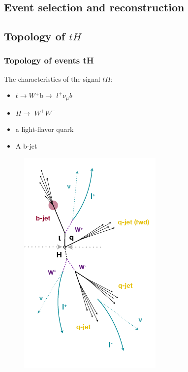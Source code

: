 \documentclass[11pt]{beamer}
\begin{document}
\begin{frame}
\section{Event selection and reconstruction}
\subsection{Topology of $tH$}
\frametitle{Topology of events tH}
The characteristics of the signal $tH$:

\begin{multicols}{2}
	\small{
\begin{itemize}
\item $t\rightarrow W$$^+$b$\rightarrow$ $l^+ \nu_\mu b$
\item $H\rightarrow$ $W^+$$W^-$ 

\item a light-flavor quark 
\item  A b-jet  
\end{itemize}
}
\columnbreak
\begin{figure}
	\centering
	\includegraphics[scale=0.5]{figures/jet.png}
\end{figure}
\end{multicols}
\end{frame}
\end{document}
